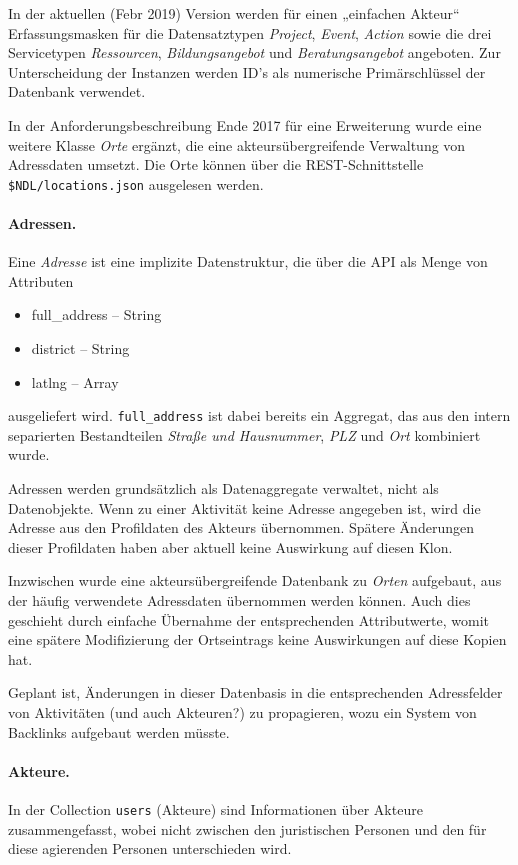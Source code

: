 \documentclass[a4paper,11pt]{article}
\begin{document}
In der aktuellen (Febr 2019) Version werden für einen „einfachen Akteur“
Erfassungsmasken für die Datensatztypen \emph{Project}, \emph{Event},
\emph{Action} sowie die drei Servicetypen \emph{Ressourcen},
\emph{Bildungsangebot} und \emph{Beratungsangebot} angeboten.  Zur
Unterscheidung der Instanzen werden ID's als numerische Primärschlüssel der
Datenbank verwendet.

In der Anforderungsbeschreibung Ende 2017 für eine Erweiterung wurde eine
weitere Klasse \emph{Orte} ergänzt, die eine akteursübergreifende Verwaltung
von Adressdaten umsetzt. Die Orte können über die REST-Schnittstelle
\texttt{\$NDL/locations.json} ausgelesen werden.

\paragraph{Adressen.}
Eine \emph{Adresse} ist eine implizite Datenstruktur, die über die API als
Menge von Attributen
\begin{itemize}\itemsep0pt
  \item full\_address -- String
  \item district -- String
  \item latlng -- Array
\end{itemize}
ausgeliefert wird. \texttt{full\_address} ist dabei bereits ein Aggregat, das
aus den intern separierten Bestandteilen \emph{Straße und Hausnummer},
\emph{PLZ} und \emph{Ort} kombiniert wurde.

Adressen werden grundsätzlich als Datenaggregate verwaltet, nicht als
Datenobjekte.  Wenn zu einer Aktivität keine Adresse angegeben ist, wird die
Adresse aus den Profildaten des Akteurs übernommen.  Spätere Änderungen dieser
Profildaten haben aber aktuell keine Auswirkung auf diesen Klon.

Inzwischen wurde eine akteursübergreifende Datenbank zu \emph{Orten}
aufgebaut, aus der häufig verwendete Adressdaten übernommen werden können.
Auch dies geschieht durch einfache Übernahme der entsprechenden Attributwerte,
womit eine spätere Modifizierung der Ortseintrags keine Auswirkungen auf diese
Kopien hat.

Geplant ist, Änderungen in dieser Datenbasis in die entsprechenden
Adressfelder von Aktivitäten (und auch Akteuren?) zu propagieren, wozu ein
System von Backlinks aufgebaut werden müsste. 

\paragraph{Akteure.}
In der Collection \texttt{users} (Akteure) sind Informationen über Akteure
zusammengefasst, wobei nicht zwischen den juristischen Personen und den für
diese agierenden Personen unterschieden wird. 
\end{document}
